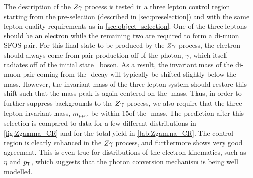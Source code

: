 The description of the $Z\gamma$ process is tested in a three lepton control
region starting from the 
pre-selection (described in \sec\ref{sec:preselection}) and with the same
lepton quality requirements as in \sec\ref{sec:object_selection}.
One of the three leptons should be an electron while the remaining two 
are required to form a di-muon SFOS pair. For this final state to be produced
by the $Z\gamma$ process, the electron should always come from 
pair production off of the photon, $\gamma$, which itself radiates
off of the initial state \z~boson.  As a result, the invariant mass
of the di-muon pair coming from the \z-decay will typically be shifted
slightly below the \z-mass. However, the invariant mass of the three lepton 
system should restore this shift such that the mass peak is again centered 
on the \z-mass. Thus, in order to further suppress backgrounds to the 
$Z\gamma$ process, we also require that the three-lepton invariant
mass, $m_{\mu\mu e}$, be within 15\GeV of the \z-mass.
The prediction after this selection is compared to data for a few different
distributions in \fig\ref{fig:Zgamma_CR} and for the total yield
in \tab\ref{tab:Zgamma_CR}. The control region is clearly enhanced
in the $Z\gamma$ process, and furthermore shows very good agreement. 
This is even true for distributions of the electron kinematics, 
such as $\eta$ and $p_{\mathrm{T}}$, which suggests that the photon conversion
mechanism is being well modelled.

